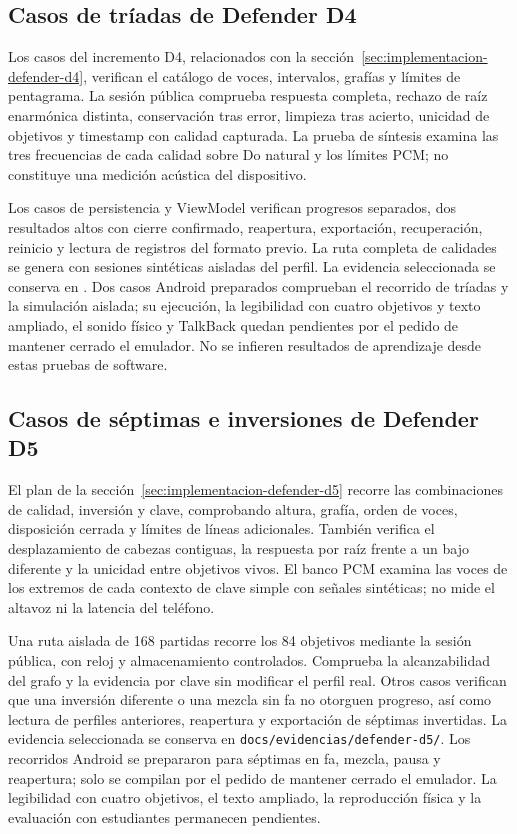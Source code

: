 \subsection{Casos de tríadas de Defender D4}
Los casos del incremento D4, relacionados con la
sección~\ref{sec:implementacion-defender-d4}, verifican el
catálogo de voces, intervalos, grafías y límites de pentagrama. La sesión
pública comprueba respuesta completa, rechazo de raíz enarmónica distinta,
conservación tras error, limpieza tras acierto, unicidad de objetivos y
timestamp con calidad capturada. La prueba de síntesis examina las tres
frecuencias de cada calidad sobre Do natural y los límites PCM; no constituye
una medición acústica del dispositivo.

Los casos de persistencia y ViewModel verifican progresos separados, dos
resultados altos con cierre confirmado, reapertura, exportación, recuperación,
reinicio y lectura de registros del formato previo. La ruta completa de
calidades se genera con sesiones sintéticas aisladas del perfil. La evidencia
seleccionada se conserva en .
Dos casos Android preparados comprueban el recorrido de tríadas y la
simulación aislada; su ejecución, la legibilidad con cuatro objetivos y
texto ampliado, el sonido físico y TalkBack quedan pendientes por el pedido
de mantener cerrado el emulador. No se infieren resultados de aprendizaje
desde estas pruebas de software.
\subsection{Casos de séptimas e inversiones de Defender D5}
El plan de la sección~\ref{sec:implementacion-defender-d5} recorre las
combinaciones de calidad, inversión y clave, comprobando altura, grafía,
orden de voces, disposición cerrada y límites de líneas adicionales.
También verifica el desplazamiento de cabezas contiguas, la respuesta por
raíz frente a un bajo diferente y la unicidad entre objetivos vivos.
El banco PCM examina las voces de los extremos de cada contexto de clave
simple con señales sintéticas; no mide el altavoz ni la latencia del teléfono.

Una ruta aislada de 168 partidas recorre los 84 objetivos mediante la sesión
pública, con reloj y almacenamiento controlados. Comprueba la alcanzabilidad
del grafo y la evidencia por clave sin modificar el perfil real.
Otros casos verifican que una inversión diferente o una mezcla sin fa no
otorguen progreso, así como lectura de perfiles anteriores, reapertura y
exportación de séptimas invertidas. La evidencia seleccionada se conserva
en \texttt{docs/evidencias/defender-d5/}.
Los recorridos Android se prepararon para séptimas en fa, mezcla, pausa y
reapertura; solo se compilan por el pedido de mantener cerrado el emulador.
La legibilidad con cuatro objetivos, el texto ampliado, la reproducción
física y la evaluación con estudiantes permanecen pendientes.
